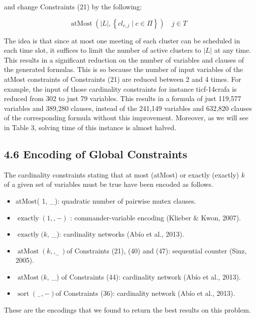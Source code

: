 \documentclass[10pt]{article}
\begin{document}
and change Constraints (21) by the following:


\begin{equation*}
\operatorname{atMost}\left(|L|,\left\{c l_{c, j} \mid c \in \Pi\right\}\right) \quad j \in T \tag{47}
\end{equation*}


The idea is that since at most one meeting of each cluster can be scheduled in each time slot, it suffices to limit the number of active clusters to $|L|$ at any time. This results in a significant reduction on the number of variables and clauses of the generated formulas. This is so because the number of input variables of the atMost constraints of Constraints (21) are reduced between 2 and 4 times. For example, the input of those cardinality constraints for instance ticf-14crafa is reduced from 302 to just 79 variables. This results in a formula of just 119,577 variables and 389,280 clauses, instead of the 241,149 variables and 632,820 clauses of the corresponding formula without this improvement. Moreover, as we will see in Table 3, solving time of this instance is almost halved.

\subsection*{4.6 Encoding of Global Constraints}
The cardinality constraints stating that at most (atMost) or exactly (exactly) $k$ of a given set of variables must be true have been encoded as follows.

\begin{itemize}
  \item atMost( 1, \_): quadratic number of pairwise mutex clauses.
  \item $\operatorname{exactly}(1,,-)$ : commander-variable encoding (Klieber \& Kwon, 2007).
  \item $\operatorname{exactly}(k$, \_): cardinality networks (Abío et al., 2013).
  \item $\operatorname{atMost}\left(k,,_{-}\right)$of Constraints (21), (40) and (47): sequential counter (Sinz, 2005).
  \item $\operatorname{atMost}(k$, \_) of Constraints (44): cardinality network (Abío et al., 2013).
  \item $\operatorname{sort}\left({ }_{-},-\right)$of Constraints (36): cardinality network (Abío et al., 2013).
\end{itemize}

These are the encodings that we found to return the best results on this problem.
\end{document}
